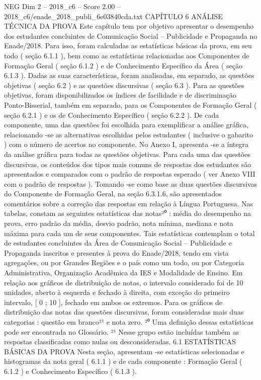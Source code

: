 \begin{textsample}{NEG Dim 2 – 2018\_c6 – Score 2.00 – 2018\_c6/enade\_2018\_publi\_6e03840cda.txt}  \label{ex:f2_neg_245}
CAPÍTULO 6 ANÁLISE TÉCNICA DA PROVA Este capítulo tem por objetivo apresentar o desempenho dos estudantes concluintes de Comunicação Social – Publicidade e Propaganda no Enade/2018.
Para isso, foram calculadas as estatísticas básicas da prova, em seu todo ( seção 6.1.1 ), bem como as estatísticas relacionadas aos Componentes de Formação Geral ( seção 6.1.2 ) e de Conhecimento Específico da Área ( seção 6.1.3 ).
Dadas as suas características, foram analisadas, em separado, as questões objetivas ( seção 6.2 ) e as questões discursivas ( seção 6.3 ).
Para as questões objetivas, foram disponibilizados os índices de facilidade e de discriminação Ponto-Bisserial, também em separado, para os Componentes de Formação Geral ( seção 6.2.1 ) e os de Conhecimento Específico ( seção 6.2.2 ).
De cada componente, uma das questões foi escolhida para exemplificar a análise gráfica, relacionando -se as alternativas escolhidas pelos estudantes ( inclusive o gabarito ) com o número de acertos no componente.
No Anexo I, apresenta -se a íntegra da análise gráfica para todas as questões objetivas.
Para cada uma das questões discursivas, os conteúdos dos tipos mais comuns de respostas dos estudantes são apresentados e comparados com o padrão de respostas esperado ( ver Anexo VIII com o padrão de respostas ).
Tomando -se como base as duas questões discursivas do Componente de Formação Geral, na seção 6.3.1.6, são apresentados comentários sobre a correção das respostas em relação à Língua Portuguesa.
Nas tabelas, constam as seguintes estatísticas das notas²⁰ : média do desempenho na prova, erro padrão da média, desvio padrão, nota mínima, mediana e nota máxima para cada um de seus componentes.
Tais estatísticas contemplam o total de estudantes concluintes da Área de Comunicação Social – Publicidade e Propaganda inscritos e presentes à prova do Enade/2018, tendo em vista agregações, ou por Grandes Regiões e o país como um todo, ou por Categoria Administrativa, Organização Acadêmica da IES e Modalidade de Ensino.
Em relação aos gráficos de distribuição de notas, o intervalo considerado foi de 10 unidades, aberto à esquerda e fechado à direita, com exceção do primeiro intervalo, [ 0 ; 10 ], fechado em ambos os extremos.
Para os gráficos de distribuição das notas das questões discursivas, foram consideradas mais duas categorias : questão em branco²¹ e nota zero. ²⁰ Uma definição dessas estatísticas pode ser encontrada no Glossário. ²¹ Nesse grupo estão incluídas também as respostas classificadas como nulas ou desconsideradas. 6.1 ESTATÍSTICAS BÁSICAS DA PROVA Nesta seção, apresentam -se estatísticas selecionadas e histogramas da nota geral ( 6.1.1 ) e de cada componente : Formação Geral ( 6.1.2 ) e Conhecimento Específico ( 6.1.3 ).

\end{textsample}
